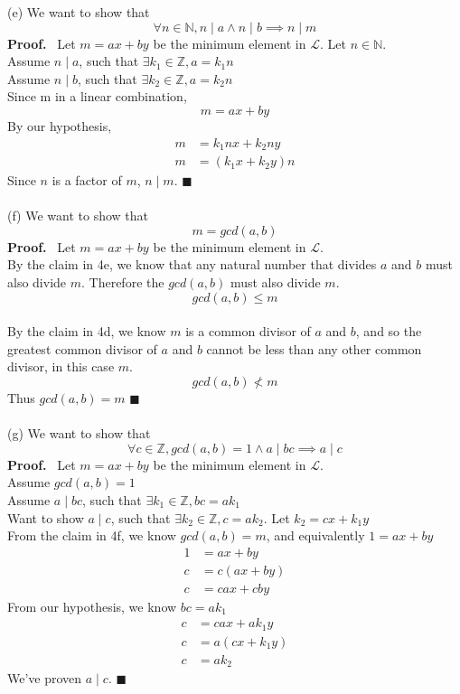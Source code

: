 \documentclass{article}
\newcommand{\Z}{\mathbb{Z}}
\newcommand{\N}{\mathbb{N}}
\begin{document}
\begin{enumerate}
	(e) We want to show that $$\forall n \in \N, n \mid a \wedge n \mid b \implies n \mid m$$
	\textbf{Proof.} \ Let $m = ax + by$ be the minimum element in $\mathcal{L}$. Let $n \in \N$. \\
	Assume $n \mid a$, such that $\exists k_1 \in \Z, a = k_1n$\\
	Assume $n \mid b$, such that $\exists k_2 \in \Z, a = k_2n$\\
	Since m in a linear combination, $$m = ax + by$$
	By our hypothesis, 
	\begin{align*}
	m &= k_1nx + k_2ny\\
	m &= (k_1x + k_2y)n
	\end{align*}
	Since $n$ is a factor of $m$, $n \mid m$. \null\hfill $\blacksquare$\\\\

	(f) We want to show that $$m = gcd(a,b)$$
	\textbf{Proof.} \ Let $m = ax + by$ be the minimum element in $\mathcal{L}$.\\
	By the claim in 4e, we know that any natural number that divides $a$ and $b$ must also divide $m$. Therefore the $gcd(a, b)$ must also divide $m$. $$gcd(a,b) \leq m$$\\
	By the claim in 4d, we know $m$ is a common divisor of $a$ and $b$, and so the greatest common divisor of $a$ and $b$ cannot be less than any other common divisor, in this case $m$. $$gcd(a,b) \nless m$$
	Thus $gcd(a, b) = m$ \null\hfill $\blacksquare$\\\\
	(g) We want to show that $$\forall c \in \Z, gcd(a, b) = 1 \wedge a \mid bc \implies a \mid c$$
	\textbf{Proof.} \ Let $m = ax + by$ be the minimum element in $\mathcal{L}$.\\
	Assume $gcd(a, b) = 1$\\
	Assume $a \mid bc$, such that $\exists k_1 \in \Z, bc = ak_1$\\
	Want to show $a \mid c$, such that  $\exists k_2 \in \Z, c = ak_2$. Let $k_2 = cx + k_1y$\\
	From the claim in 4f, we know $gcd(a,b) = m$, and equivalently $1 = ax + by$
	\begin{align*}
	1 &= ax + by\\
	c &= c(ax + by)\\
	c &= cax + cby
	\end{align*}
	From our hypothesis, we know $bc = ak_1$
	\begin{align*}
	c &= cax + ak_1y\\
	c &= a(cx + k_1y)\\
	c &= ak_2
	\end{align*}
	We've proven $a \mid c$. \null\hfill $\blacksquare$\\\\


\end{enumerate}
\end{document}
